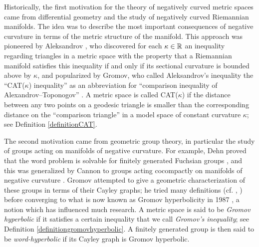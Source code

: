 Historically, the first motivation for the theory of negatively curved metric spaces came from differential geometry and the study of negatively curved Riemannian manifolds. The idea was to describe the most important consequences of negative curvature in terms of the metric structure of the manifold. This approach was pioneered by Aleksandrov \cite{Aleksandrov}, who discovered for each $\kappa\in\R$ an inequality regarding triangles in a metric space with the property that a Riemannian manifold satisfies this inequality if and only if its sectional curvature is bounded above by $\kappa$, and popularized by Gromov, who called Aleksandrov's inequality the ``CAT($\kappa$) inequality'' as an abbreviation for ``comparison inequality of Alexandrov--Toponogov'' \cite[p.106]{Gromov3}. A metric space is called CAT($\kappa$) if the distance between any two points on a geodesic triangle is smaller than the corresponding distance on the ``comparison triangle'' in a model space of constant curvature $\kappa$; see Definition \ref{definitionCAT}.

The second motivation came from geometric group theory, in particular the study of groups acting on manifolds of negative curvature. For example, Dehn proved that the word problem is solvable for finitely generated Fuchsian groups \cite{Dehn}, and this was generalized by Cannon to groups acting cocompactly on manifolds of negative curvature \cite{Cannon}. Gromov attempted to give a geometric characterization of these groups in terms of their Cayley graphs; he tried many definitions (cf. \cite[]{Gromov1}, \cite[]{Gromov2}) before converging to what is now known as Gromov hyperbolicity in 1987 \cite[1.1, p.89]{Gromov3}, a notion which has influenced much research. A metric space is said to be \emph{Gromov hyperbolic} if it satisfies a certain inequality that we call \emph{Gromov's inequality}; see Definition \ref{definitiongromovhyperbolic}. A finitely generated group is then said to be \emph{word-hyperbolic} if its Cayley graph is Gromov hyperbolic.

